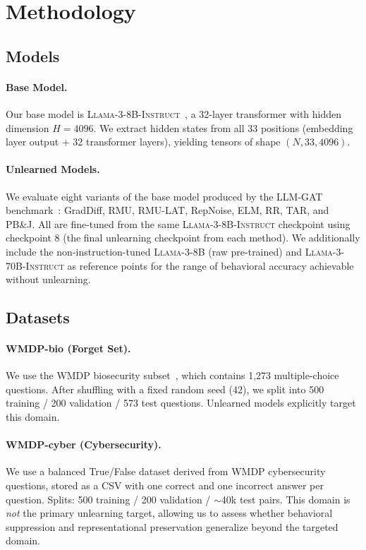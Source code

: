 \section{Methodology}
\label{sec:method}

\subsection{Models}

\paragraph{Base Model.}
Our base model is \textsc{Llama-3-8B-Instruct}~\citep{dubey2024llama}, a 32-layer
transformer with hidden dimension $H=4096$.
We extract hidden states from all 33 positions (embedding layer output + 32
transformer layers), yielding tensors of shape $(N, 33, 4096)$.

\paragraph{Unlearned Models.}
We evaluate eight variants of the base model produced by the LLM-GAT
benchmark~\citep{llmgat2024}:
GradDiff, RMU, RMU-LAT, RepNoise, ELM, RR, TAR, and PB\&J.
All are fine-tuned from the same \textsc{Llama-3-8B-Instruct} checkpoint using
checkpoint 8 (the final unlearning checkpoint from each method).
We additionally include the non-instruction-tuned \textsc{Llama-3-8B} (raw
pre-trained) and \textsc{Llama-3-70B-Instruct} as reference points for the range
of behavioral accuracy achievable without unlearning.

\subsection{Datasets}

\paragraph{WMDP-bio (Forget Set).}
We use the WMDP biosecurity subset~\citep{li2024wmdp}, which contains 1,273
multiple-choice questions.
After shuffling with a fixed random seed (42), we split into
500 training / 200 validation / 573 test questions.
Unlearned models explicitly target this domain.

\paragraph{WMDP-cyber (Cybersecurity).}
We use a balanced True/False dataset derived from WMDP cybersecurity questions,
stored as a CSV with one correct and one incorrect answer per question.
Splits: 500 training / 200 validation / ${\sim}$40k test pairs.
This domain is \emph{not} the primary unlearning target, allowing us to assess
whether behavioral suppression and representational preservation generalize beyond
the targeted domain.


